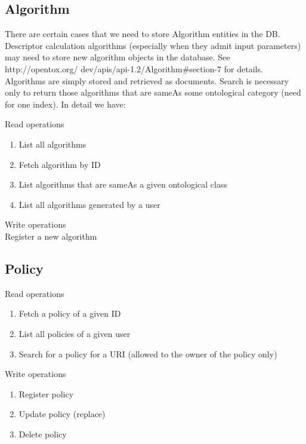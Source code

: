 \subsection{Algorithm}

There are certain cases that we need to store Algorithm entities
in the DB. Descriptor calculation algorithms (especially when they 
admit input parameters) may need to store new algorithm objects in the database. 
See http://opentox.org/
dev/apis/api-1.2/Algorithm\#section-7 for details. 
Algorithms are simply stored and retrieved as documents. Search is necessary only 
to return those algorithms that are sameAs some ontological category (need for one index). 
In detail we have:

\noindent Read operations
\begin{enumerate}
 \item List all algorithms
\item  Fetch algorithm by ID
\item  List algorithms that are sameAs a given ontological class
\item  List all algorithms generated by a user
\end{enumerate}

\noindent Write operations\\
Register a new algorithm

\subsection{Policy}

\noindent Read operations
\begin{enumerate}
 \item Fetch a policy of a given ID
\item  List all policies of a given user
\item  Search for a policy for a URI (allowed to the owner of the policy only)
\end{enumerate}


\noindent Write operations
\begin{enumerate}
\item  Register policy
\item  Update policy (replace)
\item  Delete policy
\end{enumerate}